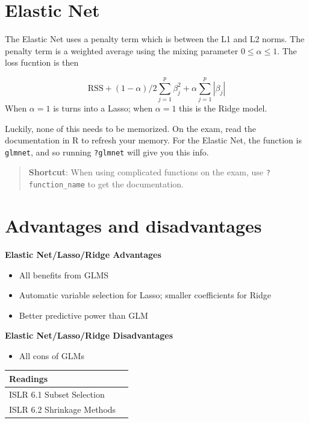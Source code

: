 \documentclass[
  openany]{book}
\providecommand{\tightlist}{%
  \setlength{\itemsep}{0pt}\setlength{\parskip}{0pt}}
\begin{document}
\hypertarget{elastic-net}{%
\section{Elastic Net}\label{elastic-net}}

The Elastic Net uses a penalty term which is between the L1 and L2 norms. The penalty term is a weighted average using the mixing parameter \(0 \leq \alpha \leq 1\). The loss fucntion is then

\[\text{RSS} + (1 - \alpha)/2 \sum_{j = 1}^{p}\beta_j^2 + \alpha \sum_{j = 1}^p |\beta_j|\]
When \(\alpha = 1\) is turns into a Lasso; when \(\alpha = 1\) this is the Ridge model.

Luckily, none of this needs to be memorized. On the exam, read the documentation in R to refresh your memory. For the Elastic Net, the function is \texttt{glmnet}, and so running \texttt{?glmnet} will give you this info.

\begin{quote}
\textbf{Shortcut}: When using complicated functions on the exam, use \texttt{?function\_name} to get the documentation.
\end{quote}

\hypertarget{advantages-and-disadvantages-1}{%
\section{Advantages and disadvantages}\label{advantages-and-disadvantages-1}}

\textbf{Elastic Net/Lasso/Ridge Advantages}

\begin{itemize}
\tightlist
\item
  All benefits from GLMS
\item
  Automatic variable selection for Lasso; smaller coefficients for Ridge
\item
  Better predictive power than GLM
\end{itemize}

\textbf{Elastic Net/Lasso/Ridge Disadvantages}

\begin{itemize}
\tightlist
\item
  All cons of GLMs
\end{itemize}

\begin{longtable}[]{@{}ll@{}}
\toprule
Readings &\tabularnewline
\midrule
\endhead
ISLR 6.1 Subset Selection &\tabularnewline
ISLR 6.2 Shrinkage Methods &\tabularnewline
\bottomrule
\end{longtable}
\end{document}
